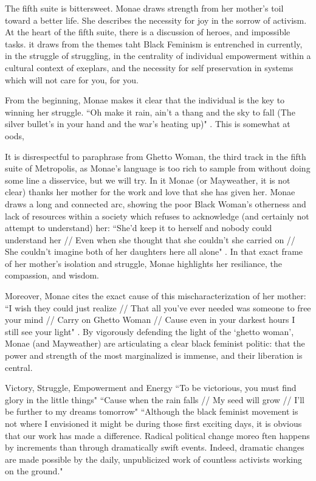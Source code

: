 \documentclass[a4paper, 11pt]{article} %
\begin{document}
The fifth suite is bittersweet.
Monae draws strength from her mother's toil toward a better life.
She describes the necessity for joy in the sorrow of activism.
At the heart of the fifth suite, there is a discussion of heroes, and impossible tasks.
it draws from the themes taht Black Feminism is entrenched in currently, in the struggle of struggling, in the centrality of individual empowerment within a cultural context of exeplars, and the necessity for self preservation in systems which will not care for you, for you.

From the beginning, Monae makes it clear that the individual is the key to winning her struggle.
``Oh make it rain, ain't a thang and the sky to fall (The silver bullet's in your hand and the war's heating up)" \cite{manymoons}.
This is somewhat at oods, 

It is disrespectful to paraphrase from Ghetto Woman, the third track in the fifth suite of Metropolis, as Monae's language is too rich to sample from without doing some line a disservice, but we will try.
In it Monae (or Mayweather, it is not clear) thanks her mother for the work and love that she has given her.
Monae draws a long and connected arc, showing the poor Black Woman's otherness and lack of resources within a society which refuses to acknowledge (and certainly not attempt to understand) her:
``She'd keep it to herself and nobody could understand her // Even when she thought that she couldn't she carried on // She couldn't imagine both of her daughters here all alone" \cite{ghettowoman}.
In that exact frame of her mother's isolation and struggle, Monae highlights her resiliance, the compassion, and wisdom.

Moreover, Monae cites the exact cause of this mischaracterization of her mother:
``I wish they could just realize // That all you've ever needed was someone to free your mind // Carry on Ghetto Woman // Cause even in your darkest hours I still see your light" \cite{ghettowoman}.
By vigorously defending the light of the `ghetto woman', Monae (and Mayweather) are articulating a clear black feminist politic: that the power and strength of the most marginalized is immense, and their liberation is central. 



Victory, Struggle, Empowerment and Energy
``To be victorious, you must find glory in the little things" \cite{victory}
``Cause when the rain falls // My seed will grow // I'll be further to my dreams tomorrow" \cite{victory}
``Although the black feminist movement is not where I envisioned it might be during those first exciting days, it is obvious that our work has made a difference. Radical political change moreo ften happens by increments than through dramatically swift events. Indeed, dramatic changes are made possible by the daily, unpublicized work of countless activists working on the ground." \cite{smithhomegirls}
\end{document}
